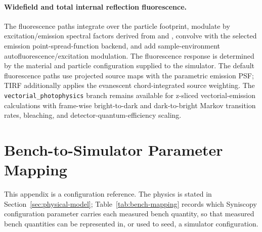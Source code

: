 \paragraph{Widefield and total internal reflection fluorescence.} The fluorescence paths integrate  over the particle footprint, modulate by excitation/emission spectral factors derived from  and , convolve with the selected emission point-spread-function backend, and add sample-environment autofluorescence/excitation modulation. The fluorescence response is determined by the material and particle configuration supplied to the simulator. The default fluorescence paths use projected source maps with the parametric emission PSF; TIRF additionally applies the evanescent chord-integrated source weighting. The \texttt{vectorial\_photophysics} branch remains available for z-sliced vectorial-emission calculations with frame-wise bright-to-dark and dark-to-bright Markov transition rates, bleaching, and detector-quantum-efficiency scaling.

\section{Bench-to-Simulator Parameter Mapping}
\label{sec:bench-mapping}

This appendix is a configuration reference. The physics is stated in Section~\ref{sec:physical-model}; Table~\ref{tab:bench-mapping} records which Syniscopy configuration parameter carries each measured bench quantity, so that measured bench quantities can be represented in, or used to seed, a simulator configuration.

